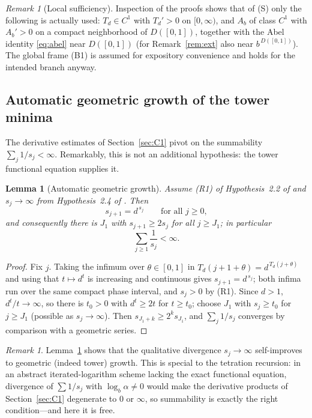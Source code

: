 \documentclass[11pt]{article}
\newtheorem{lemma}[theorem]{Lemma}
\theoremstyle{definition}
\theoremstyle{remark}
\newtheorem{remark}[theorem]{Remark}
\newcommand{\Ab}{A_{b}}
\newcommand{\Td}{T_{d}}
\begin{document}
\begin{remark}[Local sufficiency]\label{rem:local}
Inspection of the proofs shows that of (S) only the following is actually
used: $\Td\in C^{1}$ with $\Td'>0$ on $[0,\infty)$, and $\Ab$ of class
$C^{1}$ with $\Ab'>0$ on a compact neighborhood of $D([0,1])$, together
with the Abel identity \eqref{eq:abel} near $D([0,1])$ (for
Remark~\ref{rem:ext} also near $b^{\,D([0,1])}$). The global frame (B1)
is assumed for expository convenience and holds for the intended branch
anyway.
\end{remark}

\subsection{Automatic geometric growth of the tower minima}

The derivative estimates of Section~\ref{sec:C1} pivot on the summability
$\sum_j 1/s_j<\infty$. Remarkably, this is not an additional hypothesis:
the tower functional equation supplies it.

\begin{lemma}[Automatic geometric growth]\label{lem:growth}
Assume \textup{(R1)} of Hypothesis~2.2 of \cite{J} and $s_j\to\infty$
from Hypothesis~2.4 of \cite{J}. Then
\[
s_{j+1}=d^{\,s_j}\qquad\text{for all }j\ge0,
\]
and consequently there is $J_1$ with $s_{j+1}\ge 2s_j$ for all $j\ge J_1$;
in particular
\[
\sum_{j\ge1}\frac{1}{s_j}<\infty .
\]
\end{lemma}

\begin{proof}
Fix $j$. Taking the infimum over $\theta\in[0,1]$ in
$\Td(j+1+\theta)=d^{\,\Td(j+\theta)}$ and using that $t\mapsto d^{t}$ is
increasing and continuous gives $s_{j+1}=d^{\,s_j}$; both infima run over
the same compact phase interval, and $s_j>0$ by (R1). Since $d>1$,
$d^{t}/t\to\infty$, so there is $t_0>0$ with $d^{t}\ge 2t$ for $t\ge t_0$;
choose $J_1$ with $s_j\ge t_0$ for $j\ge J_1$ (possible as
$s_j\to\infty$). Then $s_{J_1+k}\ge 2^{k}s_{J_1}$, and $\sum_j 1/s_j$
converges by comparison with a geometric series.
\end{proof}

\begin{remark}\label{rem:growthrole}
Lemma~\ref{lem:growth} shows that the qualitative divergence
$s_j\to\infty$ self-improves to geometric (indeed tower) growth. This is
special to the tetration recursion: in an abstract iterated-logarithm
scheme lacking the exact functional equation, divergence of $\sum 1/s_j$
with $\log_b\alpha\neq0$ would make the derivative products of
Section~\ref{sec:C1} degenerate to $0$ or $\infty$, so summability is
exactly the right condition---and here it is free.
\end{remark}
\end{document}
